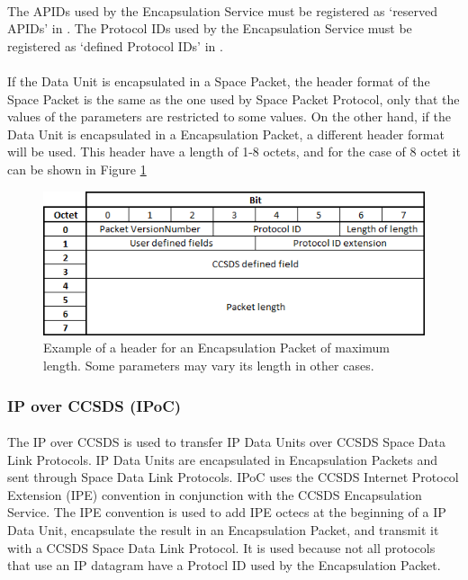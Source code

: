\paragraph{}The APIDs used by the Encapsulation Service must be registered as ‘reserved APIDs’ in \cite{SANAAPID}. The Protocol IDs used by the Encapsulation Service must be registered as ‘defined Protocol IDs’ in \cite{SANAPID}.
\paragraph{}If the Data Unit is encapsulated in a Space Packet, the header format of the Space Packet is the same as the one used by Space Packet Protocol, only that the values of the parameters are restricted to some values. On the other hand, if the Data Unit is encapsulated in a Encapsulation Packet, a different header format will be used. This header have a length of 1-8 octets, and for the case of 8 octet it can be shown in Figure \ref{fig:ESheader}
\begin{figure}[H]
\begin{center}
\includegraphics[scale=1]{ES_header.PNG}
\caption[Encapsulation header]{Example of a header for an Encapsulation Packet of maximum length. Some parameters may vary its length in other cases.}
\label{fig:ESheader}
\end{center}
\end{figure}

\subsubsection*{IP over CCSDS (IPoC)\cite{IPoC}}
\paragraph{}The IP over CCSDS is used to transfer IP Data Units over CCSDS Space Data Link Protocols. IP Data Units are encapsulated in Encapsulation Packets and sent through Space Data Link Protocols. IPoC uses the CCSDS Internet Protocol
Extension (IPE) convention in conjunction with the CCSDS Encapsulation Service. The IPE convention is used to add IPE octecs at the beginning of a IP Data Unit, encapsulate the result in an Encapsulation Packet, and transmit it with a CCSDS Space Data Link Protocol. It is used because not all protocols that use an IP datagram have a Protocl ID used by the Encapsulation Packet.

